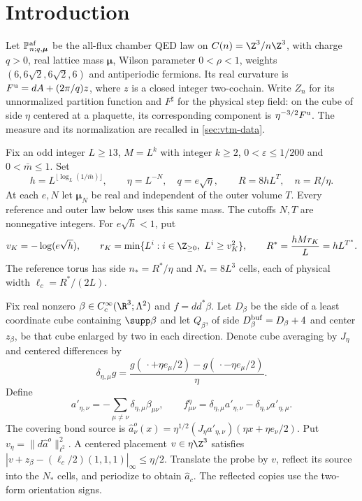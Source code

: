 \section{Introduction}\label{sec:vtm-introduction}

Let $\mathbb P_{n;q,\boldsymbol\mu}^{\rm af}$ be the all-flux
chamber QED law on $C(n)=\Z^3/n\Z^3$, with charge $q>0$,
real lattice mass $\boldsymbol\mu$, Wilson parameter $0<\rho<1$,
weights $(6,6\sqrt2,6\sqrt2,6)$ and antiperiodic fermions.
Its real curvature is $F^{\rm u}=dA+(2\pi/q)z$, where $z$ is
a closed integer two-cochain. Write $Z_n$ for its unnormalized
partition function and $F^\sharp$ for the physical step field:
on the cube of side $\eta$ centered at a plaquette, its
corresponding component is $\eta^{-3/2}F^{\rm u}$.
The measure and its normalization are recalled in
\cref{sec:vtm-data}.

Fix an odd integer $L\ge13$, $M=L^k$ with integer $k\ge2$,
$0<\varepsilon\le1/200$ and $0<\bar m\le1$. Set
\begin{equation}\label{eq:cutoff-scales}
 h=L^{\lfloor\log_L(1/\bar m)\rfloor},\qquad
 \eta=L^{-N},\quad q=e\sqrt\eta,\qquad R=8hL^T,\quad n=R/\eta.
\end{equation}
At each $e,N$ let $\boldsymbol\mu_N$ be real and independent
of the outer volume $T$. Every reference and outer law below
uses this same mass. The cutoffs $N,T$ are nonnegative integers.
For $e\sqrt h<1$, put
\[
 v_K=-\log(e\sqrt h),\qquad
 r_K=\min\{L^i:i\in\Z_{\ge0},\ L^i\ge v_K^2\},
 \qquad R^*=\frac{hMr_K}{L}=hL^{T^*}.
\]
The reference torus has side $n_*=R^*/\eta$ and
$N_*=8L^3$ cells, each of physical width $\ell_c=R^*/(2L)$.

Fix real nonzero $\beta\in C_c^\infty(\R^3;\Lambda^2)$ and
$f=dd^*\beta$. Let $D_\beta$ be the side of a least coordinate
cube containing $\supp\beta$ and let $Q_\beta$, of side
$D_\beta^{\rm buf}=D_\beta+4$ and center $z_\beta$, be that
cube enlarged by two in each direction. Denote cube averaging
by $J_\eta$ and centered differences by
\[
 \delta_{\eta,\mu}g=
 \frac{g(\,\cdot+\eta e_\mu/2)-g(\,\cdot-\eta e_\mu/2)}{\eta}.
\]
Define
\begin{equation}\label{eq:cells-smooth-test}
 a'_{\eta,\nu}=-\sum_{\mu\ne\nu}\delta_{\eta,\mu}\beta_{\mu\nu},
 \qquad
 f^\eta_{\mu\nu}=\delta_{\eta,\mu}a'_{\eta,\nu}
                     -\delta_{\eta,\nu}a'_{\eta,\mu}.
\end{equation}
The covering bond source is
$\widehat a^o_\nu(x)=\eta^{1/2}(J_\eta a'_{\eta,\nu})(\eta x+\eta e_\nu/2)$.
Put $v_\eta=\|d\widehat a^o\|_{\ell^2}^2$.
A centered placement $v\in\eta\Z^3$ satisfies
$|v+z_\beta-(\ell_c/2)(1,1,1)|_\infty\le\eta/2$.
Translate the probe by $v$, reflect its source into the
$N_*$ cells, and periodize to obtain $\widehat a_c$.
The reflected copies use the two-form orientation signs.

